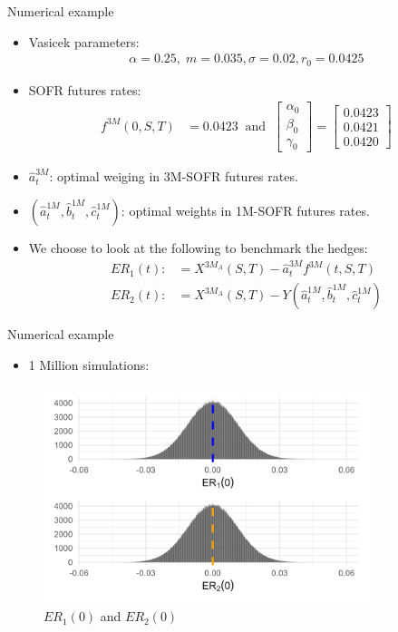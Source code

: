 \documentclass[UKenglish]{beamer}
\begin{document}
\begin{frame}{Numerical example}
\begin{itemize}
    \item Vasicek parameters: 
    \begin{align*}
    \alpha = 0.25, \; m = 0.035, \sigma = 0.02, r_{0} = 0.0425  
    \end{align*} 
    \item SOFR futures rates: 
    \begin{align*}
    f^{3M}(0,S,T) &= 0.0423
    \;\;\text{and}\;\;
    \begin{bmatrix}
    \alpha_{0} \\ 
    \beta_{0} \\ 
    \gamma_{0} 
    \end{bmatrix}
    =
    \begin{bmatrix}
    0.0423 \\ 
    0.0421 \\ 
    0.0420 
    \end{bmatrix}
    \end{align*}
    \item $\hat{a}_{t}^{3M}$: optimal weiging in 3M-SOFR futures rates. 
    \item $(\hat{a}_{t}^{1M}, \hat{b}_{t}^{1M}, \hat{c}_{t}^{1M})$: optimal weights in 1M-SOFR futures rates. 
    \item We choose to look at the following to benchmark the hedges:
    \begin{align*}
    ER_{1}(t) :&= X^{3M_{A}}(S,T) - \hat{a}_{t}^{3M}f^{3M}(t,S,T) \\ 
    ER_{2}(t) :&= X^{3M_{A}}(S,T) - Y(\hat{a}_{t}^{1M}, \hat{b}_{t}^{1M}, \hat{c}_{t}^{1M})
    \end{align*}    
\end{itemize}
    
\end{frame}


\begin{frame}{Numerical example}
\begin{itemize}
    \item 1 Million simulations:
\end{itemize}

\begin{figure}[htp]
    \centering
    \includegraphics[width=9.5cm]{SOFR/SOFR_error_plt.png}
    \caption{$ER_{1}(0)$ and $ER_{2}(0)$}
    \label{fig: SOFR_error_plt}
\end{figure}

    
\end{frame}
\end{document}

